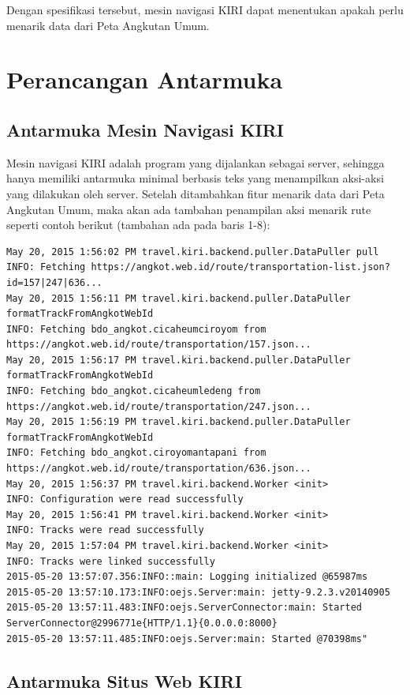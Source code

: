 Dengan spesifikasi tersebut, mesin navigasi KIRI dapat menentukan apakah perlu menarik data dari Peta Angkutan Umum.

\section{Perancangan Antarmuka}

\subsection{Antarmuka Mesin Navigasi KIRI}

Mesin navigasi KIRI adalah program yang dijalankan sebagai server, sehingga hanya memiliki antarmuka minimal berbasis teks yang menampilkan aksi-aksi yang dilakukan oleh server. Setelah ditambahkan fitur menarik data dari Peta Angkutan Umum, maka akan ada tambahan penampilan aksi menarik rute seperti contoh berikut (tambahan ada pada baris 1-8):

\begin{lstlisting}
May 20, 2015 1:56:02 PM travel.kiri.backend.puller.DataPuller pull
INFO: Fetching https://angkot.web.id/route/transportation-list.json?id=157|247|636...
May 20, 2015 1:56:11 PM travel.kiri.backend.puller.DataPuller formatTrackFromAngkotWebId
INFO: Fetching bdo_angkot.cicaheumciroyom from https://angkot.web.id/route/transportation/157.json...
May 20, 2015 1:56:17 PM travel.kiri.backend.puller.DataPuller formatTrackFromAngkotWebId
INFO: Fetching bdo_angkot.cicaheumledeng from https://angkot.web.id/route/transportation/247.json...
May 20, 2015 1:56:19 PM travel.kiri.backend.puller.DataPuller formatTrackFromAngkotWebId
INFO: Fetching bdo_angkot.ciroyomantapani from https://angkot.web.id/route/transportation/636.json...
May 20, 2015 1:56:37 PM travel.kiri.backend.Worker <init>
INFO: Configuration were read successfully
May 20, 2015 1:56:41 PM travel.kiri.backend.Worker <init>
INFO: Tracks were read successfully
May 20, 2015 1:57:04 PM travel.kiri.backend.Worker <init>
INFO: Tracks were linked successfully
2015-05-20 13:57:07.356:INFO::main: Logging initialized @65987ms
2015-05-20 13:57:10.173:INFO:oejs.Server:main: jetty-9.2.3.v20140905
2015-05-20 13:57:11.483:INFO:oejs.ServerConnector:main: Started ServerConnector@2996771e{HTTP/1.1}{0.0.0.0:8000}
2015-05-20 13:57:11.485:INFO:oejs.Server:main: Started @70398ms"
\end{lstlisting}


\subsection{Antarmuka Situs Web KIRI}

